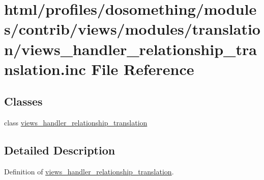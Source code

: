 \hypertarget{views__handler__relationship__translation_8inc}{
\section{html/profiles/dosomething/modules/contrib/views/modules/translation/views\_\-handler\_\-relationship\_\-translation.inc File Reference}
\label{views__handler__relationship__translation_8inc}
}
\subsection*{Classes}
\begin{DoxyCompactItemize}
\item 
class \hyperlink{classviews__handler__relationship__translation}{views\_\-handler\_\-relationship\_\-translation}
\end{DoxyCompactItemize}


\subsection{Detailed Description}
Definition of \hyperlink{classviews__handler__relationship__translation}{views\_\-handler\_\-relationship\_\-translation}. 
